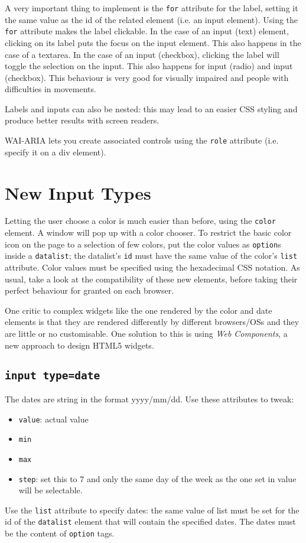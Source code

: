 \documentclass[a4paper,11pt]{book}
\begin{document}
A very important thing to implement is the \texttt{for} attribute for the label, setting it
the same value as the id of the related element (i.e. an input element). Using the
\texttt{for} attribute makes the label clickable. In the case of an input (text)
element, clicking on its label puts the focus on the input element. 
This also happens in the case of a textarea.
In the case of an
input (checkbox), clicking the label will toggle the selection on the input.
This also happens for input (radio) and input (checkbox).
This behaviour
is very good for visually impaired and people with difficulties in movements.

Labels and inputs can also be nested: this may lead to an easier CSS styling and produce
better results with screen readers.

WAI-ARIA lets you create associated controls using the \texttt{role} attribute (i.e.
specify it on a div element).

\section{New Input Types}
Letting the user choose a color is much easier than before, using the \texttt{color} element.
A window will pop up with a color chooser. To restrict the basic color icon on the page
to a selection of few colors, put the color values  as \texttt{option}s inside a \texttt{datalist};
the datalist's \texttt{id} must have the same value of the color's \texttt{list} attribute.
Color values must be specified using the hexadecimal CSS notation. As usual, take a look at
the compatibility of these new elements, before taking their perfect behaviour for granted on
each browser.

One critic to complex widgets like the one rendered by the color and date elements is that
they are rendered differently by different browsers/OSs
and they are little or no customisable.
One solution to this is using \textit{Web Components}, a new approach to design HTML5 widgets.
\subsection{\texttt{input type=date}}
The dates are string in the format yyyy/mm/dd.
Use these attributes to tweak:
\begin{itemize}
\item \texttt{value}: actual value
\item \texttt{min}
\item \texttt{max}
\item \texttt{step}: set this to 7 and only the same day of the week as the one set in value
will be selectable.
\end{itemize}
Use the \texttt{list} attribute to specify dates: the same value of list must be set for
the id of the \texttt{datalist} element that will contain the specified dates. The dates
must be the content of \texttt{option} tags.
\end{document}
